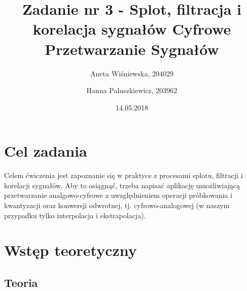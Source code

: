 \documentclass[12pt]{article}
\title{{\bf Zadanie nr 3 - Splot, filtracja i korelacja sygnałów}\linebreak
Cyfrowe Przetwarzanie Sygnałów}
\author{Aneta Wiśniewska, 204029 \and Hanna Paluszkiewicz, 203962}
\date{14.05.2018}
\begin{document}
\clearpage\maketitle
\thispagestyle{empty}
\newpage
\setcounter{page}{1}
\section{Cel zadania}

Celem ćwiczenia jest zapoznanie się w praktyce z procesami splotu, filtracji i korelacji sygnałów. Aby to osiągnąć, trzeba napisać aplikację umożliwiającą przetwarzanie analgowo-cyfrowe z uwzględnieniem operacji próbkowania i kwantyzacji oraz konwersji odwrotnej, tj. cyfrowo-analogowej (w naszym przypadku tylko interpolacja i ekstrapolacja).

\section{Wstęp teoretyczny}

\subsection{Teoria}


\end{document}
